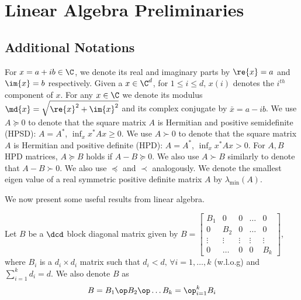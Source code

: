 \appendix
\section{Linear Algebra Preliminaries}\label{sec:appendix}
\subsection{Additional Notations}\label{sec:addnot}
For $x=a+ib\in \C$, we denote its real and imaginary parts by $\re{x}=a$ and $\im{x}=b$ respectively. Given a $x\in \C^d$, for $1\leq i \leq d$, $x(i)$ denotes the $i^{th}$ component of $x$.
For any $x\in \C$ we denote its modulus $\md{x}=\sqrt{\re{x}^2+\im{x}^2}$ and its complex conjugate by $\bar{x}=a-ib$.
We use $A\succeq 0$ to denote that the
square matrix $A$ is Hermitian and positive semidefinite (HPSD):
$A = A^*$, $\inf_x x^* A x\ge 0$. We use $A\succ 0$ to denote that the square matrix $A$ is Hermitian and positive definite (HPD): $A=A^*$, $\inf_x x^* A x > 0$.
For $A,B$ HPD matrices, $A\succeq B$ holds if $A-B\succeq 0$.
We also use $A\succ B$ similarly to denote that $A-B \succ 0$.
We also use $\preceq$ and $\prec$ analogously. We denote the smallest eigen value of a real symmetric positive definite matrix $A$ by $\lambda_{\min}(A)$.\par
We now present some useful results from linear algebra.

Let $B$ be a $\dcd$ block diagonal matrix given by $B=\begin{bmatrix} B_1 &0 &0 &\ldots &0 \\ 0 &B_2 &0 &\ldots &0  \\ \vdots &\vdots &\vdots &\vdots &\vdots \\ 0 &\ldots &0 &0 &B_k \end{bmatrix}$, where $B_i$ is a $d_i \times d_i$ matrix such that $d_i<d,\,\forall i=1,\ldots,k$ (w.l.o.g) and $\sum_{i=1}^k d_i=d$. We also denote $B$ as
\begin{align*}
B=B_1 \op B_2 \op \ldots B_k=\op_{i=1}^k B_i
\end{align*}

